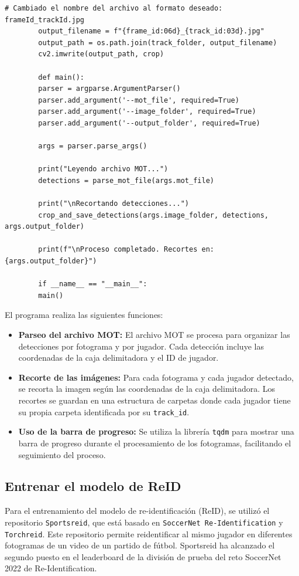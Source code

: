\documentclass[12pt, a4paper, twoside]{article}
\begin{document}
\begin{lstlisting}[style=pythonstyle]
		# Cambiado el nombre del archivo al formato deseado: frameId_trackId.jpg
		output_filename = f"{frame_id:06d}_{track_id:03d}.jpg"
		output_path = os.path.join(track_folder, output_filename)
		cv2.imwrite(output_path, crop)
		
		def main():
		parser = argparse.ArgumentParser()
		parser.add_argument('--mot_file', required=True)
		parser.add_argument('--image_folder', required=True)
		parser.add_argument('--output_folder', required=True)
		
		args = parser.parse_args()
		
		print("Leyendo archivo MOT...")
		detections = parse_mot_file(args.mot_file)
		
		print("\nRecortando detecciones...")
		crop_and_save_detections(args.image_folder, detections, args.output_folder)
		
		print(f"\nProceso completado. Recortes en: {args.output_folder}")
		
		if __name__ == "__main__":
		main()
	\end{lstlisting}
	\vspace{0.5cm}
	
	El programa realiza las siguientes funciones:
	
	\begin{itemize}
		\item \textbf{Parseo del archivo MOT:} El archivo MOT se procesa para organizar las detecciones por fotograma y por jugador. Cada detección incluye las coordenadas de la caja delimitadora y el ID de jugador.
		\item \textbf{Recorte de las imágenes:} Para cada fotograma y cada jugador detectado, se recorta la imagen según las coordenadas de la caja delimitadora. Los recortes se guardan en una estructura de carpetas donde cada jugador tiene su propia carpeta identificada por su \texttt{track\_id}.
		\item \textbf{Uso de la barra de progreso:} Se utiliza la librería \texttt{tqdm} para mostrar una barra de progreso durante el procesamiento de los fotogramas, facilitando el seguimiento del proceso.
	\end{itemize}
	
	
	\subsection{Entrenar el modelo de ReID}
	
	Para el entrenamiento del modelo de re-identificación (ReID), se utilizó el repositorio \texttt{Sportsreid}, que está basado en \texttt{SoccerNet Re-Identification} y \texttt{Torchreid}. Este repositorio permite reidentificar al mismo jugador en diferentes fotogramas de un video de un partido de fútbol. Sportsreid ha alcanzado el segundo puesto en el leaderboard de la división de prueba del reto SoccerNet 2022 de Re-Identification.
	
\end{document}
